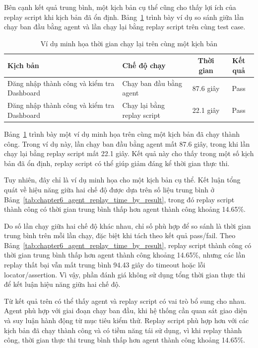 Bên cạnh kết quả trung bình, một kịch bản cụ thể cũng cho thấy lợi ích của replay script khi kịch bản đã ổn định. Bảng~\ref{tab:chapter6_replay_case_example} trình bày ví dụ so sánh giữa lần chạy ban đầu bằng agent và lần chạy lại bằng replay script trên cùng test case.

\begin{table}[H]
\centering
\caption{Ví dụ minh họa thời gian chạy lại trên cùng một kịch bản}
\label{tab:chapter6_replay_case_example}
\renewcommand{\arraystretch}{1.2}
\begin{tabular}{|p{4.5cm}|p{4.2cm}|c|c|}
\hline
\textbf{Kịch bản} & \textbf{Chế độ chạy} & \textbf{Thời gian} & \textbf{Kết quả} \\
\hline
Đăng nhập thành công và kiểm tra Dashboard & Chạy ban đầu bằng agent & 87.6 giây & Pass \\
\hline
Đăng nhập thành công và kiểm tra Dashboard & Chạy lại bằng replay script & 22.1 giây & Pass \\
\hline
\end{tabular}
\end{table}

Bảng~\ref{tab:chapter6_replay_case_example} trình bày một ví dụ minh họa trên cùng một kịch bản đã chạy thành công. Trong ví dụ này, lần chạy ban đầu bằng agent mất 87.6 giây, trong khi lần chạy lại bằng replay script mất 22.1 giây. Kết quả này cho thấy trong một số kịch bản đã ổn định, replay script có thể giúp giảm đáng kể thời gian thực thi.

Tuy nhiên, đây chỉ là ví dụ minh họa cho một kịch bản cụ thể. Kết luận tổng quát về hiệu năng giữa hai chế độ được dựa trên số liệu trung bình ở Bảng~\ref{tab:chapter6_agent_replay_time_by_result}, trong đó replay script thành công có thời gian trung bình thấp hơn agent thành công khoảng 14.65\%.

Do số lần chạy giữa hai chế độ khác nhau, chỉ số phù hợp để so sánh là thời gian trung bình trên mỗi lần chạy, đặc biệt khi tách theo kết quả pass/fail. Theo Bảng~\ref{tab:chapter6_agent_replay_time_by_result}, replay script thành công có thời gian trung bình thấp hơn agent thành công khoảng 14.65\%, nhưng các lần replay thất bại vẫn mất trung bình 94.43 giây do timeout hoặc lỗi locator/assertion. Vì vậy, phần đánh giá không sử dụng tổng thời gian thực thi để kết luận hiệu năng giữa hai chế độ.

Từ kết quả trên có thể thấy agent và replay script có vai trò bổ sung cho nhau. Agent phù hợp với giai đoạn chạy ban đầu, khi hệ thống cần quan sát giao diện và suy luận hành động từ mục tiêu kiểm thử. Replay script phù hợp hơn với các kịch bản đã chạy thành công và có tiềm năng tái sử dụng, vì khi replay thành công, thời gian thực thi trung bình thấp hơn agent thành công khoảng 14.65\%.

